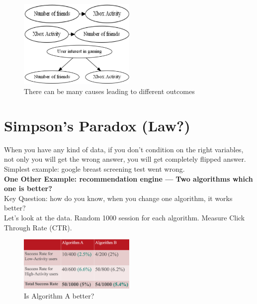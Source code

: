 \begin{figure}[ht]
  \begin{center}
    \includegraphics[width=0.5\textwidth]{figures/1.png}
    \caption{
      There can be many causes leading to different outcomes}
    \label{fig:example_figure}
  \end{center}
\end{figure}

\section{Simpson's Paradox (Law?)}
When you have any kind of data, if you don’t condition on the right variables, not only you will get the wrong answer, you will get completely flipped answer.\\
Simplest example: google breast screening test went wrong.\\
\textbf{One Other Example: recommendation engine --- Two algorithms which one is better?}\\
Key Question: how do you know, when you change one algorithm, it works better?\\
Let’s look at the data. Random 1000 session for each algorithm. Measure Click Through Rate (CTR).\\
\begin{figure}[ht]
  \begin{center}
    \includegraphics[width=0.5\textwidth]{figures/2.png}
    \caption{
      Is Algorithm A better?}
    \label{fig:example_figure}
  \end{center}
\end{figure} \\

